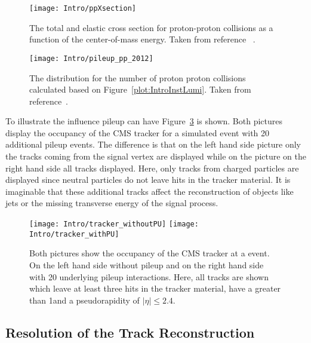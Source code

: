 \begin{figure}[!Hhtb]
  \centering
  \texttt{[image: Intro/ppXsection]}
  \caption[Total and elastic cross section for pp interactions]{The total and elastic cross section for proton-proton collisions as a function of the center-of-mass energy. Taken from reference ~.\label{plot:IntroTotalCross}}
\end{figure}

\begin{figure}[!Hhtb]
  \centering
  \texttt{[image: Intro/pileup\_pp\_2012]}
  \caption[Number of pp collisions]{The distribution for the number of proton proton collisions calculated based on Figure~\ref{plot:IntroInstLumi}. Taken from reference~. \label{plot:IntroPileupDistr}}
\end{figure}

To illustrate the influence pileup can have Figure~\ref{plot:IntroOccuTracker} is shown. Both pictures display the occupancy of the CMS tracker for a simulated \ttbar event with 20 additional pileup events. The difference is that on the left hand side picture only the tracks coming from the signal vertex are displayed while on the picture on the right hand side all tracks displayed. Here, only tracks from charged particles are displayed since neutral particles do not leave hits in the tracker material. It is imaginable that these additional tracks affect the reconstruction of objects like jets or the missing transverse energy of the signal process. 

\begin{figure}[!Hhtb]
  \centering
  \texttt{[image: Intro/tracker\_withoutPU]}
  \texttt{[image: Intro/tracker\_withPU]}
  \caption[Occupancy of the tracker with and without pileup]{Both pictures show the occupancy of the CMS tracker at a \ttbar event. On the left hand side without pileup and on the right hand side with 20 underlying pileup interactions. Here, all tracks are shown which leave at least three hits in the tracker material, have a \pt greater than 1\GeVc and a pseudorapidity of $\left|\eta\right|\leq2.4$. \label{plot:IntroOccuTracker}}
\end{figure}

\subsection{Resolution of the Track Reconstruction}


